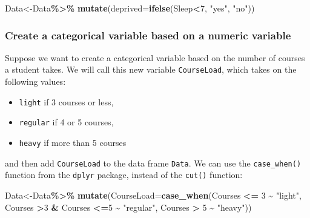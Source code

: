 \documentclass[
]{book}
\newenvironment{Shaded}{\begin{snugshade}}{\end{snugshade}}
\newcommand{\AttributeTok}[1]{\textcolor[rgb]{0.13,0.29,0.53}{#1}}
\newcommand{\DecValTok}[1]{\textcolor[rgb]{0.00,0.00,0.81}{#1}}
\newcommand{\FunctionTok}[1]{\textcolor[rgb]{0.13,0.29,0.53}{\textbf{#1}}}
\newcommand{\NormalTok}[1]{#1}
\newcommand{\OtherTok}[1]{\textcolor[rgb]{0.56,0.35,0.01}{#1}}
\newcommand{\SpecialCharTok}[1]{\textcolor[rgb]{0.81,0.36,0.00}{\textbf{#1}}}
\newcommand{\StringTok}[1]{\textcolor[rgb]{0.31,0.60,0.02}{#1}}
\providecommand{\tightlist}{%
  \setlength{\itemsep}{0pt}\setlength{\parskip}{0pt}}
\begin{document}
\begin{Shaded}
\begin{Highlighting}[]
\NormalTok{Data}\OtherTok{\textless{}{-}}\NormalTok{Data}\SpecialCharTok{\%\textgreater{}\%}
  \FunctionTok{mutate}\NormalTok{(}\AttributeTok{deprived=}\FunctionTok{ifelse}\NormalTok{(Sleep}\SpecialCharTok{\textless{}}\DecValTok{7}\NormalTok{, }\StringTok{"yes"}\NormalTok{, }\StringTok{"no"}\NormalTok{))}
\end{Highlighting}
\end{Shaded}

\hypertarget{create-a-categorical-variable-based-on-a-numeric-variable-1}{%
\subsubsection{Create a categorical variable based on a numeric variable}\label{create-a-categorical-variable-based-on-a-numeric-variable-1}}

Suppose we want to create a categorical variable based on the number of courses a student takes. We will call this new variable \texttt{CourseLoad}, which takes on the following values:

\begin{itemize}
\tightlist
\item
  \texttt{light} if 3 courses or less,
\item
  \texttt{regular} if 4 or 5 courses,
\item
  \texttt{heavy} if more than 5 courses
\end{itemize}

and then add \texttt{CourseLoad} to the data frame \texttt{Data}. We can use the \texttt{case\_when()} function from the \texttt{dplyr} package, instead of the \texttt{cut()} function:

\begin{Shaded}
\begin{Highlighting}[]
\NormalTok{Data}\OtherTok{\textless{}{-}}\NormalTok{Data}\SpecialCharTok{\%\textgreater{}\%}
  \FunctionTok{mutate}\NormalTok{(}\AttributeTok{CourseLoad=}\FunctionTok{case\_when}\NormalTok{(Courses }\SpecialCharTok{\textless{}=} \DecValTok{3} \SpecialCharTok{\textasciitilde{}} \StringTok{"light"}\NormalTok{, }
\NormalTok{                              Courses }\SpecialCharTok{\textgreater{}}\DecValTok{3} \SpecialCharTok{\&}\NormalTok{ Courses }\SpecialCharTok{\textless{}=}\DecValTok{5} \SpecialCharTok{\textasciitilde{}} \StringTok{"regular"}\NormalTok{, }
\NormalTok{                              Courses }\SpecialCharTok{\textgreater{}} \DecValTok{5} \SpecialCharTok{\textasciitilde{}} \StringTok{"heavy"}\NormalTok{))}
\end{Highlighting}
\end{Shaded}
\end{document}
